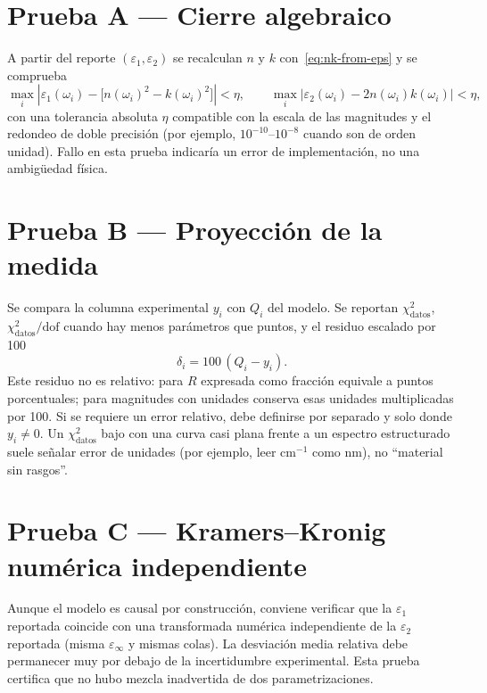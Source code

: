 \section{Prueba A --- Cierre algebraico}

A partir del reporte $(\varepsilon_1,\varepsilon_2)$ se recalculan $n$ y $k$ con~\eqref{eq:nk-from-eps} y se comprueba
\begin{equation}
\max_i\left|
\varepsilon_1(\omega_i)-\bigl[n(\omega_i)^{2}-k(\omega_i)^{2}\bigr]
\right|<\eta,
\qquad
\max_i\left|
\varepsilon_2(\omega_i)-2n(\omega_i)k(\omega_i)
\right|<\eta,
\end{equation}
con una tolerancia absoluta $\eta$ compatible con la escala de las magnitudes y el redondeo de doble precisi\'on (por ejemplo, $10^{-10}$--$10^{-8}$ cuando son de orden unidad).
Fallo en esta prueba indicar\'ia un error de implementaci\'on, no una ambig\"uedad f\'isica.

\section{Prueba B --- Proyecci\'on de la medida}

Se compara la columna experimental $y_i$ con $Q_i$ del modelo.
Se reportan $\chi^{2}_{\mathrm{datos}}$, $\chi^{2}_{\mathrm{datos}}/\mathrm{dof}$ cuando hay menos par\'ametros que puntos, y el residuo escalado por 100
\begin{equation}
\delta_i=100\,(Q_i-y_i).
\end{equation}
Este residuo no es relativo: para $R$ expresada como fracci\'on equivale a puntos porcentuales; para magnitudes con unidades conserva esas unidades multiplicadas por 100. Si se requiere un error relativo, debe definirse por separado y solo donde $y_i\ne 0$.
Un $\chi^{2}_{\mathrm{datos}}$ bajo con una curva casi plana frente a un espectro estructurado suele se\~nalar error de unidades (por ejemplo, leer cm$^{-1}$ como nm), no ``material sin rasgos''.

\section{Prueba C --- Kramers--Kronig num\'erica independiente}

Aunque el modelo es causal por construcci\'on, conviene verificar que la $\varepsilon_1$ reportada coincide con una transformada num\'erica independiente de la $\varepsilon_2$ reportada (misma $\varepsilon_\infty$ y mismas colas).
La desviaci\'on media relativa debe permanecer muy por debajo de la incertidumbre experimental.
Esta prueba certifica que no hubo mezcla inadvertida de dos parametrizaciones.

